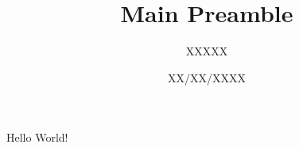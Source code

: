 \documentclass[a4paper, 10pt]{article}
\title{Main Preamble}
\author{XXXXX}
\date{XX/XX/XXXX}
\begin{document}
\maketitle
Hello World!
\end{document}
